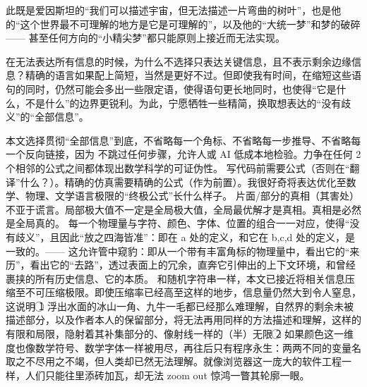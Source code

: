 此既是爱因斯坦的“我们可以描述宇宙，但无法描述一片弯曲的树叶”，也是他的“这个世界最不可理解的地方是它是可理解的”，以及他的“大统一梦”和梦的破碎 ------ 甚至任何方向的“小精尖梦”都只能原则上接近而无法实现。

在无法表达所有信息的时候，为什么不选择只表达关键信息，且不表示剩余边缘信息？精确的语言如果配上简短，当然是更好不过。但即使我有时间，在缩短这些语句的同时，仍然可能会多出一些限定语，使得语句更长地同时，也使得“它是什么，不是什么”的边界更锐利。为此，宁愿牺牲一些精简，换取想表达的“没有歧义”的“全部信息”。

本文选择贯彻“全部信息”到底，不省略每一个角标、不省略每一步推导、不省略每一个反向链接，因为 {\one} 不跳过任何步骤，允许人或 AI 低成本地检验。力争在任何 2 个相邻的公式之间都体现出数学科学的可证伪性。{\two} 写代码前需要公式（否则在“翻译”什么？）。精确的仿真需要精确的公式（作为前置）。我很好奇将表达优化至数学、物理、文学语言极限的“终极公式”长什么样子。{\three} 片面/部分的真相（其害处）不亚于谎言。局部极大值不一定是全局极大值，全局最优解才是真相。真相是必然是全局真的。 {\four} 每一个物理量与字符、颜色、字体、位置的组合一一对应，使得“没有歧义”，且因此“放之四海皆准”：即在 a 处的定义，和它在 b,c,d 处的定义，是一致的。------ 这允许管中窥豹：即从一个带有丰富角标的物理量中，看出它的“来历”，看出它的“去路”，透过表面上的冗余，直奔它引伸出的上下文环境，和曾经裹挟的所有历史信息、它的本质。{\five} 和随机字符串一样，本文已接近将相关信息压缩至不可压缩极限。即使压缩率已经高至这样的地步，信息量仍然大到令人窒息，这说明 \textcircled{1} 浮出水面的冰山一角、九牛一毛都已经那么难理解，自然界的剩余未被描述部分，以及作者本人的保留部分，将无法再用同样的方法描述和理解，这样的有限和局限，隐射着其补集部分的、像射线一样的（半）无限 \textcircled{2} 如果颜色这一维度也像数学符号、数学字体一样被用尽，再往后只有程序永生：两两不同的变量名取之不尽用之不竭，但人类却已然无法理解。就像浏览器这一庞大的软件工程一样，人们只能往里添砖加瓦，却无法 zoom out 惊鸿一瞥其轮廓一眼。

